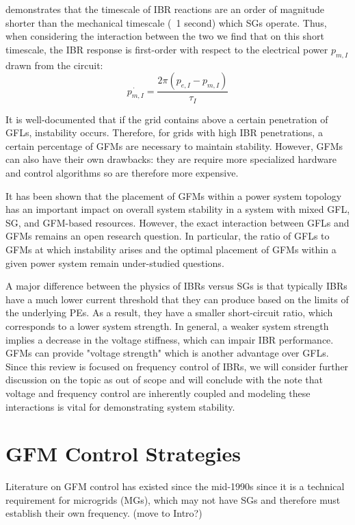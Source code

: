 \documentclass[journal]{IEEEtran}
\begin{document}
demonstrates that the timescale of IBR reactions are an order of magnitude
shorter than the mechanical timescale (~1 second) which SGs operate.
Thus, when considering the interaction between the two we find that 
on this short timescale, the IBR response is first-order with respect to the
electrical power $p_{m,I}$ drawn from the circuit:
\begin{equation}
  \dot{p_{m,I}} = \frac{2 \pi (p_{e,I} - p_{m,I})}{\tau_I}
\end{equation}

It is well-documented that if the grid contains above a certain penetration
of GFLs, instability occurs. Therefore, for grids with high
IBR penetrations, a certain percentage of GFMs are necessary to maintain
stability. However, GFMs can also have their own drawbacks: they are
require more specialized hardware and control algorithms so are
therefore more expensive.

It has been shown that the placement of GFMs within a power system
topology has an important impact on overall system stability in a 
system with mixed GFL, SG, and GFM-based resources. However,
the exact interaction between GFLs and GFMs remains an open research
question. In particular, the ratio of GFLs to GFMs at which instability
arises and the optimal placement of GFMs within a given power system
remain under-studied questions.

A major difference between the physics of IBRs versus SGs is that
typically IBRs have a much lower current threshold that they
can produce based on the limits of the underlying PEs. As a result,
they have a smaller short-circuit ratio, which corresponds to 
a lower system strength. In general, a weaker system strength
implies a decrease in the voltage stiffness, which can impair
IBR performance. GFMs can provide "voltage strength" which is another
advantage over GFLs. Since this review is focused on frequency
control of IBRs, we will consider further discussion on the topic
as out of scope and will conclude with the note that voltage and
frequency control are inherently coupled and modeling these 
interactions is vital for demonstrating system stability.

\section{GFM Control Strategies}
\label{sec:control-strategies}

Literature on GFM control has existed since the mid-1990s %
since it is a technical requirement for microgrids (MGs), which may
not have SGs and therefore must establish their own frequency.
(move to Intro?)
\end{document}
